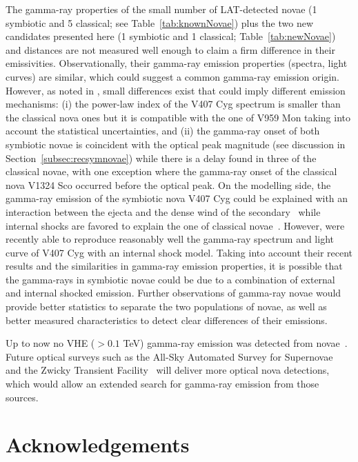 \documentclass{aa} %
\begin{document}
The gamma-ray properties of the small number of LAT-detected novae (1 symbiotic and 5 classical; see Table~\ref{tab:knownNovae}) plus the two new candidates presented here  (1 symbiotic and 1 classical; Table~\ref{tab:newNovae}) and distances are not measured well enough to claim a firm difference in their emissivities. Observationally, their gamma-ray emission properties (spectra, light curves) are similar, which could suggest a common gamma-ray emission origin. However, as noted in \citet{2014Sci...345..554A}, small differences exist that could imply different emission mechanisms: (i) the power-law index of the V407 Cyg spectrum is smaller than the classical nova ones but it is compatible with the one of V959 Mon taking into account the statistical uncertainties, and (ii) the gamma-ray onset of both symbiotic novae is coincident with the optical peak magnitude (see discussion in Section~\ref{subsec:recsymnovae}) while there is a delay found in three of the classical novae, with one exception where the gamma-ray onset of the classical nova V1324 Sco occurred before the optical peak. On the modelling side, the gamma-ray emission of the symbiotic nova V407 Cyg could be explained with an interaction between the ejecta and the dense wind of the secondary~\citep{2010Sci...329..817A,2013A&A...551A..37M} while internal shocks are favored to explain the one of classical novae~\citep{2014Sci...345..554A,2014MNRAS.442..713M}. However, \citet{2017AASubmitted} were recently able to reproduce reasonably well the gamma-ray spectrum and light curve of V407 Cyg with an internal shock model. Taking into account their recent results and the similarities in gamma-ray emission properties, it is possible that the gamma-rays in symbiotic novae could be due to a combination of external and internal shocked emission. Further observations of gamma-ray novae would provide better statistics to separate the two populations of novae, as well as better measured characteristics to detect clear differences of their emissions.

Up to now no VHE ($>0.1$ TeV) gamma-ray emission was detected from novae~\citep{Ahnen:2015pha,2012ApJ...754...77A}. Future optical surveys such as the All-Sky Automated Survey for Supernovae~\citep[ASAS-SN;][]{2014AAS...22323603S} and the Zwicky Transient Facility~\citep[ZTF;][]{2014htu..conf...27B} will deliver more optical nova detections, which would allow an extended search for gamma-ray emission from those sources.


\section*{Acknowledgements}
\end{document}
